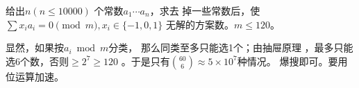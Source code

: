 \begin{prob}
	给出$n(n\le 10000)$
	个常数$a_1\cdots a_n$，求去
	掉一些常数后，使
	$\sum x_i a_i = 0 \pmod m, x_i \in \{-1,0,1\}$
	无解的方案数。$m \le 120$。
\end{prob}

\begin{sol}
	显然，如果按$a_i \bmod m$分类，
	那么同类至多只能选1个；由抽屉原理
	，最多只能选6个数，否则$ \ge 2^7 \ge 120$
	。于是只有$\binom{60}{6} \approx 5 \times 10^7$种情况。
	爆搜即可。要用位运算加速。
\end{sol}
